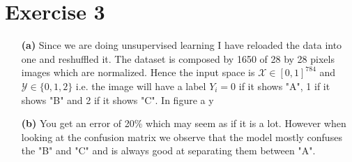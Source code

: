\documentclass[10pt,a4paper]{article}
\begin{document}
\section*{Exercise 3}
\begin{enumerate}
\item[\textbf{(a)}] Since we are doing unsupervised learning I have reloaded the data into one and reshuffled it. The dataset is composed by 1650 of 28 by 28 pixels images which are normalized. Hence the input space is $\mathcal{X} \in [0,1]^{784}$ and $\mathcal{Y} \in \{0, 1, 2\}$ i.e. the image will have a label  $Y_i = 0$ if it shows "A", 1 if it shows "B" and 2 if it shows "C".  In figure a y


\item[\textbf{(b)}] You get an error of 20\% which may seem as if it is a lot. However when looking at the confusion matrix we observe that the model mostly confuses the "B" and "C" and is always good at separating them between "A".
\end{enumerate}
\end{document}
